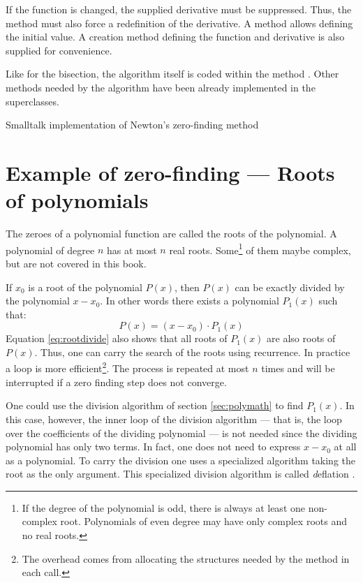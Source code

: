 If the function is changed, the supplied derivative must be
suppressed. Thus, the method  must also force a
redefinition of the derivative. A method allows defining the
initial value. A creation method defining the function and
derivative is also supplied for convenience.

Like for the bisection, the algorithm itself is coded within the
method . Other methods needed by the
algorithm have been already implemented in the superclasses.
\begin{listing} Smalltalk implementation of Newton's zero-finding method \label{ls:newtonZero}

\end{listing}

\section{Example of zero-finding --- Roots of polynomials}
\label{sec:polroots} The zeroes of a polynomial function are
called the roots of the polynomial. A polynomial of degree $n$ has
at most $n$ real roots. Some\footnote{If the degree of the
polynomial is odd, there is always at least one non-complex root.
Polynomials of even degree may have only complex roots and no real
roots.} of them maybe complex, but are not covered in this book.

If $x_0$ is a root of the polynomial $P\left(x\right)$, then
$P\left(x\right)$ can be exactly divided by the polynomial
$x-x_0$. In other words there exists a polynomial
$P_1\left(x\right)$ such that:
\begin{equation}
\label{eq:rootdivide}
  P\left(x\right) = \left(x-x_0\right)\cdot P_1\left(x\right)
\end{equation}
Equation \ref{eq:rootdivide} also shows that all roots of
$P_1\left(x\right)$ are also roots of $P\left(x\right)$. Thus, one
can carry the search of the roots using recurrence. In practice a
loop is more efficient\footnote{The overhead comes from allocating
the structures needed by the method in each call.}. The process is
repeated at most $n$ times and will be interrupted if a zero
finding step does not converge.

One could use the division algorithm of section \ref{sec:polymath}
to find $P_1\left(x\right)$. In this case, however, the inner loop
of the division algorithm --- that is, the loop over the
coefficients of the dividing polynomial --- is not needed since
the dividing polynomial has only two terms. In fact, one does not
need to express $x-x_0$ at all as a polynomial. To carry the
division one uses a specialized algorithm taking the root as the
only argument. This specialized division algorithm is called {\textsl
deflation} \cite{Press}.

